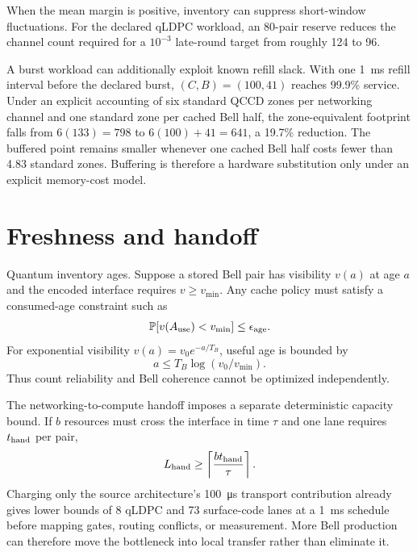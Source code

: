 \documentclass[aps,prx,reprint,superscriptaddress,nofootinbib,longbibliography,floatfix]{revtex4-2}
\begin{document}
When the mean margin is positive, inventory can suppress short-window fluctuations. For the declared qLDPC workload, an 80-pair reserve reduces the channel count required for a $10^{-3}$ late-round target from roughly 124 to 96.

A burst workload can additionally exploit known refill slack. With one \SI{1}{ms} refill interval before the declared burst, $(C,B)=(100,41)$ reaches 99.9\% service. Under an explicit accounting of six standard QCCD zones per networking channel and one standard zone per cached Bell half, the zone-equivalent footprint falls from $6(133)=798$ to $6(100)+41=641$, a 19.7\% reduction. The buffered point remains smaller whenever one cached Bell half costs fewer than 4.83 standard zones. Buffering is therefore a hardware substitution only under an explicit memory-cost model.

\section{Freshness and handoff}
Quantum inventory ages. Suppose a stored Bell pair has visibility $v(a)$ at age $a$ and the encoded interface requires $v\ge v_{\min}$. Any cache policy must satisfy a consumed-age constraint such as
\begin{equation}
\mathbb P[v(A_{\rm use})<v_{\min}]\le\epsilon_{\rm age}.
\end{equation}
For exponential visibility $v(a)=v_0e^{-a/T_B}$, useful age is bounded by
\begin{equation}
a\le T_B\log(v_0/v_{\min}).
\end{equation}
Thus count reliability and Bell coherence cannot be optimized independently.

The networking-to-compute handoff imposes a separate deterministic capacity bound. If $b$ resources must cross the interface in time $\tau$ and one lane requires $t_{\rm hand}$ per pair,
\begin{equation}
L_{\rm hand}\ge\left\lceil\frac{bt_{\rm hand}}{\tau}\right\rceil.
\end{equation}
Charging only the source architecture's \SI{100}{\micro s} transport contribution already gives lower bounds of 8 qLDPC and 73 surface-code lanes at a \SI{1}{ms} schedule before mapping gates, routing conflicts, or measurement. More Bell production can therefore move the bottleneck into local transfer rather than eliminate it.
\end{document}
